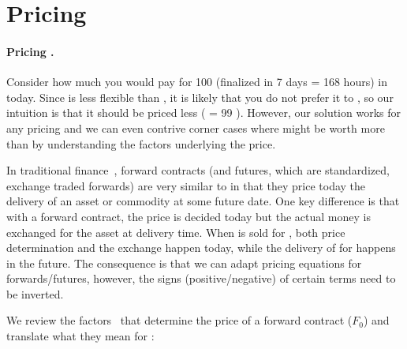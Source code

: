 

\section{Pricing}  
\label{sec:pricing}

\paragraph{Pricing \ethxx.}

Consider how much you would pay for 100 \ethxx (finalized in 7 days = 168 hours) in \ethone today. Since \ethxx is less flexible than \ethone, it is likely that you do not prefer it to \ethone, so our intuition is that it should be priced less ( \ethxx = 99 \ethone). However, our solution works for any pricing and we can even contrive corner cases where \ethxx might be worth more than \ethone by understanding the factors underlying the price. 

In traditional finance~\cite{hull2013fundamentals}, forward contracts (and futures, which are standardized, exchange traded forwards) are very similar to \ethxx in that they price today the delivery of an asset or commodity at some future date. One key difference is that with a forward contract, the price is decided today but the actual money is exchanged for the asset at delivery time. When \ethxx is sold for \ethone, both price determination and the exchange happen today, while the delivery of \ethone for \ethxx happens in the future. The consequence is that we can adapt pricing equations for forwards/futures, however, the signs (positive/negative) of certain terms need to be inverted. 

We review the factors~\cite{hull2013fundamentals} that determine the price of a forward contract ($F_0$) and translate what they mean for \ethxx:

